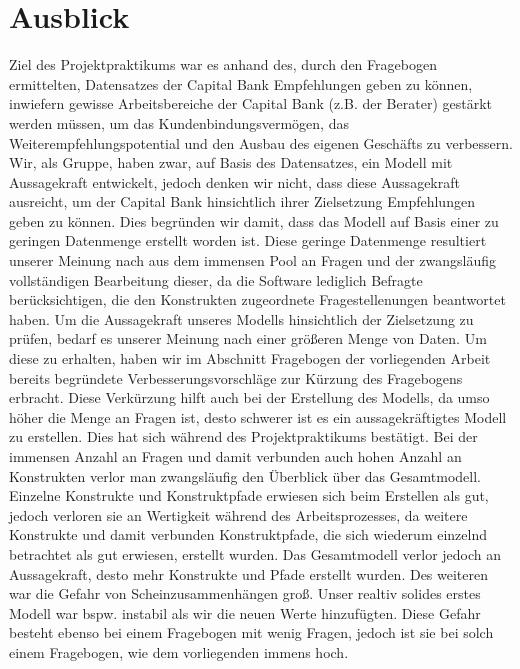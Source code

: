 \documentclass{article}\usepackage[]{graphicx}\usepackage[]{color}
\begin{document}
\section{Ausblick}%
Ziel des Projektpraktikums war es anhand des, durch den Fragebogen ermittelten, Datensatzes  der Capital Bank Empfehlungen geben zu können, inwiefern gewisse Arbeitsbereiche der Capital Bank (z.B. der Berater) gestärkt werden müssen, um das Kundenbindungsvermögen, das Weiterempfehlungspotential und den Ausbau des eigenen Geschäfts zu verbessern. Wir, als Gruppe, haben zwar, auf Basis des Datensatzes, ein Modell mit Aussagekraft entwickelt, jedoch denken wir nicht, dass diese Aussagekraft ausreicht, um der Capital Bank hinsichtlich ihrer Zielsetzung Empfehlungen geben zu können. Dies begründen wir damit, dass das Modell auf Basis einer zu geringen Datenmenge erstellt worden ist. Diese geringe Datenmenge resultiert unserer Meinung nach aus dem immensen Pool an Fragen und der zwangsläufig vollständigen Bearbeitung dieser, da die Software lediglich Befragte berücksichtigen, die den Konstrukten zugeordnete Fragestellenungen beantwortet haben. Um die Aussagekraft unseres Modells hinsichtlich der Zielsetzung zu prüfen, bedarf es unserer Meinung nach einer größeren Menge von Daten. Um diese zu erhalten, haben wir im Abschnitt Fragebogen der vorliegenden Arbeit bereits begründete Verbesserungsvorschläge zur Kürzung des Fragebogens erbracht. Diese Verkürzung hilft auch bei der Erstellung des Modells, da umso höher die Menge an Fragen ist, desto schwerer ist es ein aussagekräftigtes Modell zu erstellen. Dies hat sich während des Projektpraktikums bestätigt. Bei der immensen Anzahl an Fragen und damit verbunden auch hohen Anzahl an Konstrukten verlor man zwangsläufig den Überblick über das Gesamtmodell. Einzelne Konstrukte und Konstruktpfade erwiesen sich beim Erstellen als gut, jedoch verloren sie an Wertigkeit während des Arbeitsprozesses, da weitere Konstrukte und damit verbunden Konstruktpfade, die sich wiederum einzelnd betrachtet als gut erwiesen, erstellt wurden. Das Gesamtmodell verlor jedoch an Aussagekraft, desto mehr Konstrukte und Pfade erstellt wurden. Des weiteren war die Gefahr von Scheinzusammenhängen groß. Unser realtiv solides erstes Modell war bspw. instabil als wir die neuen Werte hinzufügten. Diese Gefahr besteht ebenso bei einem Fragebogen mit wenig Fragen, jedoch ist sie bei solch einem Fragebogen, wie dem vorliegenden immens hoch.



\appendix
\end{document}
